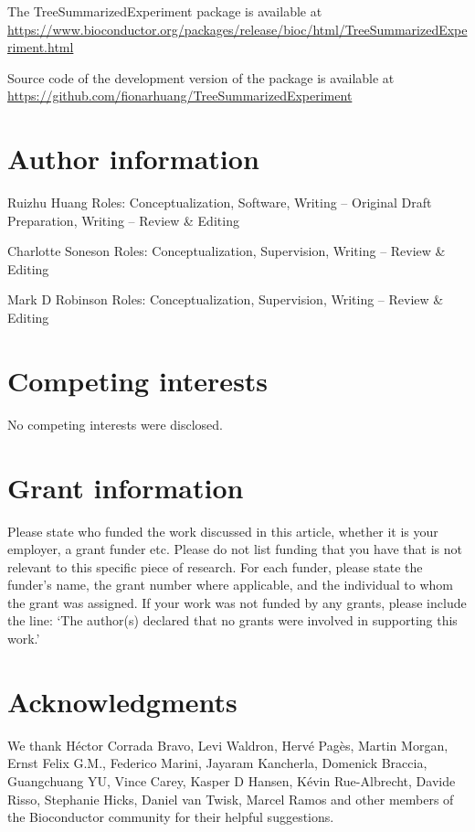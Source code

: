 \documentclass[]{article}
\begin{document}
The TreeSummarizedExperiment package is available at \url{https://www.bioconductor.org/packages/release/bioc/html/TreeSummarizedExperiment.html}

Source code of the development version of the package is available at \url{https://github.com/fionarhuang/TreeSummarizedExperiment}

\hypertarget{author-information}{%
\section{Author information}\label{author-information}}

Ruizhu Huang
Roles: Conceptualization, Software, Writing -- Original Draft Preparation, Writing -- Review \& Editing

Charlotte Soneson
Roles: Conceptualization, Supervision, Writing -- Review \& Editing

Mark D Robinson
Roles: Conceptualization, Supervision, Writing -- Review \& Editing

\hypertarget{competing-interests}{%
\section{Competing interests}\label{competing-interests}}

No competing interests were disclosed.

\hypertarget{grant-information}{%
\section{Grant information}\label{grant-information}}

Please state who funded the work discussed in this article, whether it is your employer, a grant funder etc. Please do not list funding that you have that is not relevant to this specific piece of research. For each funder, please state the funder's name, the grant number where applicable, and the individual to whom the grant was assigned. If your work was not funded by any grants, please include the line: `The author(s) declared that no grants were involved in supporting this work.'

\hypertarget{acknowledgments}{%
\section{Acknowledgments}\label{acknowledgments}}

We thank Héctor Corrada Bravo, Levi Waldron, Hervé Pagès, Martin Morgan, Ernst Felix G.M., Federico Marini, Jayaram Kancherla, Domenick Braccia, Guangchuang YU, Vince Carey, Kasper D Hansen, Kévin Rue-Albrecht, Davide Risso, Stephanie Hicks, Daniel van Twisk, Marcel Ramos and other members of the Bioconductor community for their helpful suggestions.
\end{document}
